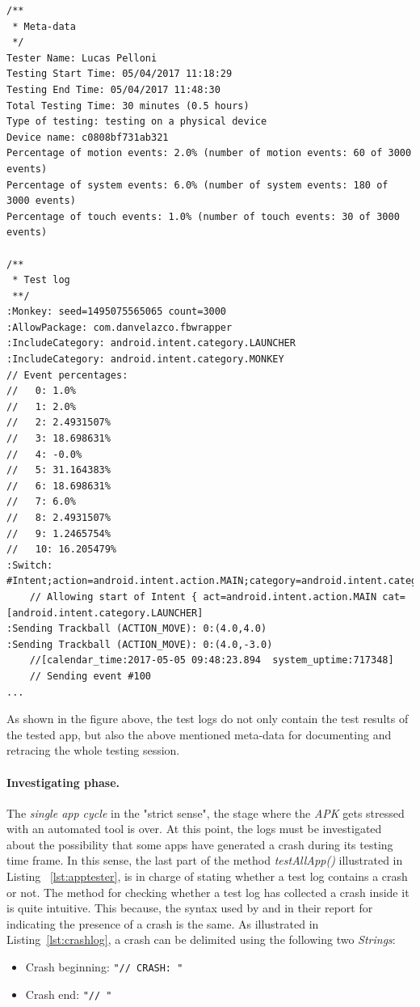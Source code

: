 \begin{lstlisting}[caption=Test log of com.danvelazco.fbwrapper, basicstyle=\fontsize{6}{8}\ttfamily,label={lst:testinglog}]
/**
 * Meta-data
 */
Tester Name: Lucas Pelloni
Testing Start Time: 05/04/2017 11:18:29
Testing End Time: 05/04/2017 11:48:30
Total Testing Time: 30 minutes (0.5 hours)
Type of testing: testing on a physical device
Device name: c0808bf731ab321
Percentage of motion events: 2.0% (number of motion events: 60 of 3000 events)
Percentage of system events: 6.0% (number of system events: 180 of 3000 events)
Percentage of touch events: 1.0% (number of touch events: 30 of 3000 events)

/**
 * Test log 
 **/
:Monkey: seed=1495075565065 count=3000
:AllowPackage: com.danvelazco.fbwrapper
:IncludeCategory: android.intent.category.LAUNCHER
:IncludeCategory: android.intent.category.MONKEY
// Event percentages:
//   0: 1.0%
//   1: 2.0%
//   2: 2.4931507%
//   3: 18.698631%
//   4: -0.0%
//   5: 31.164383%
//   6: 18.698631%
//   7: 6.0%
//   8: 2.4931507%
//   9: 1.2465754%
//   10: 16.205479%
:Switch: #Intent;action=android.intent.action.MAIN;category=android.intent.category.LAUNCHER;end
    // Allowing start of Intent { act=android.intent.action.MAIN cat=[android.intent.category.LAUNCHER]
:Sending Trackball (ACTION_MOVE): 0:(4.0,4.0)
:Sending Trackball (ACTION_MOVE): 0:(4.0,-3.0)
    //[calendar_time:2017-05-05 09:48:23.894  system_uptime:717348]
    // Sending event #100
...
\end{lstlisting}

As shown in the figure above, the test logs do not only contain the test results of the tested app, but also the above mentioned meta-data for documenting and retracing the whole testing session.

\paragraph{Investigating phase. }
The \textit{single app cycle} in the "strict sense", \ie the stage where the \textit{APK} gets stressed with an automated tool is over. At this point, the logs must be investigated about the possibility that some apps have generated a crash during its testing time frame. In this sense, the last part of the method \textit{testAllApp()} illustrated in Listing ~\ref{lst:apptester}, is in charge of stating whether a test log contains a crash or not. The method for checking whether a test log has collected a crash inside it is quite intuitive. This because, the syntax used by \monkey and \sapienz in their report for indicating the presence of a crash is the same. As illustrated in Listing~\ref{lst:crashlog}, a crash can be delimited using the following two \textit{Strings}: 
\begin{itemize}
\item Crash beginning: \texttt{"// CRASH: "}
\item Crash end: \texttt{"// "}
\end{itemize}

